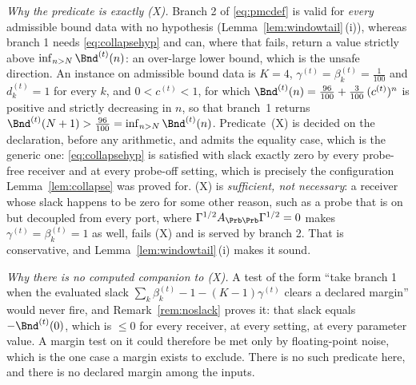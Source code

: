 
\begin{remark}\label{rem:pmc-branch-choice}
\emph{Why the predicate is exactly (X).} Branch 2 of \eqref{eq:pmcdef} is
valid for \emph{every} admissible bound data with no hypothesis
(Lemma~\ref{lem:windowtail}\,(i)), whereas branch 1 needs
\eqref{eq:collapsehyp} and can, where that fails, return a value strictly
above $\inf_{n>N}\Bnd^{(t)}(n)$: an over-large lower bound, which is the
unsafe direction. An instance on admissible bound data is $K=4$,
$\gamma^{(t)}=\beta^{(t)}_k=\tfrac{1}{100}$ and $d^{(t)}_k=1$ for every $k$,
and $0<c^{(t)}<1$, for which
$\Bnd^{(t)}(n)=\tfrac{96}{100}+\tfrac{3}{100}\,(c^{(t)})^{n}$ is positive and
strictly decreasing in $n$, so that branch~1 returns
$\Bnd^{(t)}(N+1)>\tfrac{96}{100}=\inf_{n>N}\Bnd^{(t)}(n)$.
Predicate~(X) is decided on the declaration, before any
arithmetic, and admits the equality case, which is the generic one:
\eqref{eq:collapsehyp} is satisfied with slack exactly zero by every
probe-free receiver and at every probe-off setting, which is precisely the
configuration Lemma~\ref{lem:collapse} was proved for. (X) is
\emph{sufficient, not necessary}: a receiver whose slack happens to be zero
for some other reason, such as a probe that is on but decoupled from every
port, where $\Gamma^{1/2}A_{\Prb\Prb}\Gamma^{1/2}=0$ makes
$\gamma^{(t)}=\beta^{(t)}_k=1$ as well, fails (X) and is served by branch 2.
That is conservative, and Lemma~\ref{lem:windowtail}\,(i) makes it sound.

\emph{Why there is no computed companion to (X).} A test of the form ``take
branch 1 when the evaluated slack $\sum_k\beta^{(t)}_k-1-(K-1)\gamma^{(t)}$
clears a declared margin'' would never fire, and Remark~\ref{rem:noslack}
proves it: that slack equals $-\Bnd^{(t)}(0)$, which is $\le0$ for every
receiver, at every setting, at every parameter value. A margin test on it
could therefore be met only by floating-point noise, which is the one case a
margin exists to exclude. There is no such predicate here, and there is no
declared margin among the inputs.
\end{remark}
